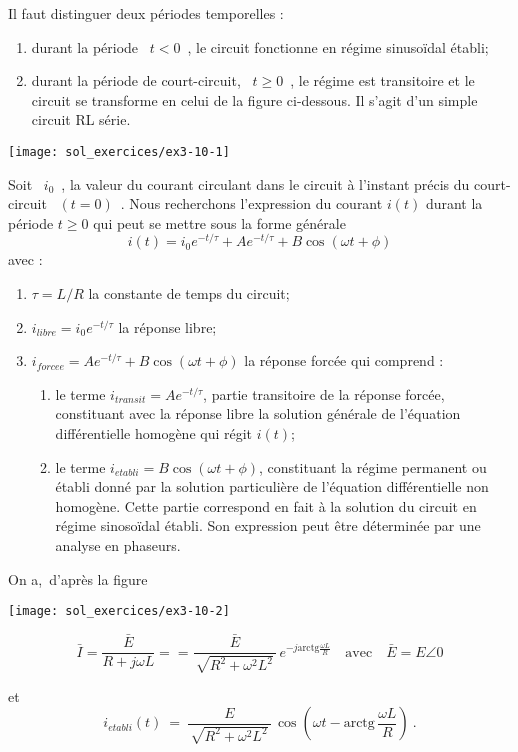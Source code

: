 Il faut distinguer deux périodes temporelles :
\begin{enumerate}
	\item durant la période \ $t<0$~, le circuit fonctionne en régime sinusoïdal établi;
	\item durant la période de court-circuit, \ $t\geq 0$~, le régime est
	transitoire et le circuit se transforme en celui de la
	figure ci-dessous. Il s'agit d'un simple circuit RL série.
\end{enumerate}
\begin{center}
	\texttt{[image: sol\_exercices/ex3-10-1]}
\end{center}
Soit \ $i_0$~, la valeur du courant circulant dans le circuit à
l'instant précis du court-circuit \ $(t=0)$~.
Nous recherchons l'expression du courant $i(t)$ durant la période
$t\geq 0$ qui peut se mettre sous la forme générale
\[i(t)=i_0e^{-t/\tau}+Ae^{-t/\tau}+B\cos(\omega t + \phi )\]
avec :
\begin{enumerate}
	\item $\tau=L/R$ la constante de temps du circuit;
	\item $i_{libre}=i_0e^{-t/\tau}$ la réponse libre;
	\item $ i_{forcee}=Ae^{-t/\tau}+B\cos(\omega t + \phi )$ la réponse forcée qui comprend :
	\begin{enumerate}
		\item le terme $i_{transit}=Ae^{-t/\tau}$, partie transitoire de la réponse
		forcée, constituant avec la réponse libre la solution générale de
		l'équation différentielle homogène qui régit $i(t)$;
		\item le terme $i_{etabli}=B\cos(\omega t + \phi )$, constituant la régime
		permanent ou établi donné par la solution particulière de
		l'équation différentielle non homogène. Cette partie correspond en
		fait à la solution du circuit en régime sinosoïdal établi.  Son
		expression peut être déterminée par une analyse en phaseurs.
	\end{enumerate}
\end{enumerate}
On a,~d'après la figure
\begin{center}
	\texttt{[image: sol\_exercices/ex3-10-2]}
\end{center}
\[
\bar{I} = \frac{\bar{E}}{R+j\omega L}=
= \frac{\bar{E}}{\, \sqrt{R^2 + \omega ^2L^2}\, }\, e^{-j\mbox{arctg} \frac{\omega L}{R}}
\quad \text{avec} \quad \bar{E}= E \angle 0\]

et 
\[ i_{etabli}(t) \: =\: \frac{E}{\, \sqrt{R^2 + \omega ^2L^2}\, }\,
\cos \left( \omega t - \mbox{arctg} \, \frac{\omega L}{R} \right)~. \]

